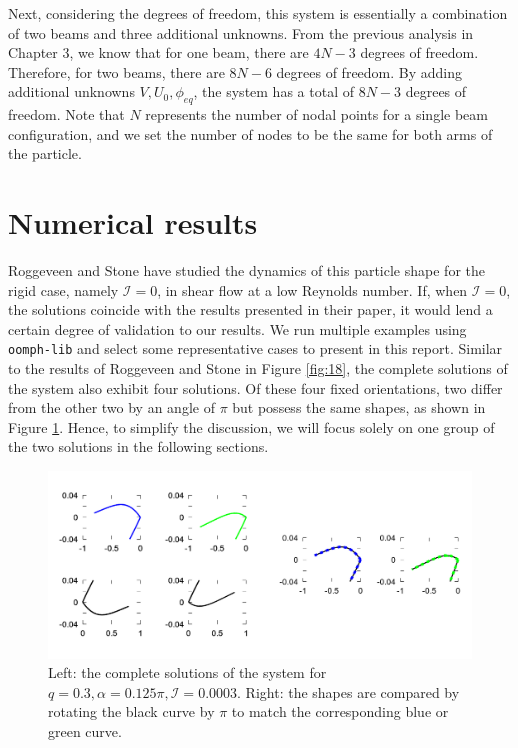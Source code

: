 \documentclass[12pt,MSc,twoside]{muthesis_2020}
\begin{document}
Next, considering the degrees of freedom, this system is essentially a combination of two beams and three additional unknowns. From the previous analysis in Chapter 3, we know that for one beam, there are $4N-3$ degrees of freedom. Therefore, for two beams, there are $8N-6$ degrees of freedom. By adding additional unknowns $V,U_0,\phi_{eq}$, the system has a total of $8N-3$ degrees of freedom. Note that $N$ represents the number of nodal points for a single beam configuration, and we set the number of nodes to be the same for both arms of the particle.


\section{Numerical results}
Roggeveen and Stone \cite{roggeveen2022motion} have studied the dynamics of this particle shape for the rigid case, namely $\mathcal{I}=0$, in shear flow at a low Reynolds number. If, when $\mathcal{I}=0$, the solutions coincide with the results presented in their paper, it would lend a certain degree of validation to our results.
We run multiple examples using \texttt{oomph-lib} and select some representative cases to present in this report. Similar to the results of Roggeveen and Stone in Figure \ref{fig:18}, the complete solutions of the system also exhibit four solutions. Of these four fixed orientations, two differ from the other two by an angle of $\pi$ but possess the same shapes, as shown in Figure \ref{fig:20}. Hence, to simplify the discussion, we will focus solely on one group of the two solutions in the following sections.
	\begin{figure}[!h]
	\begin{center}
		\includegraphics[width=1\textwidth]{plot/four_solutions2.png}
		\caption{Left: the complete solutions of the system for $q=0.3, \alpha=0.125\pi, \mathcal{I}=0.0003$. Right: the shapes are compared by rotating the black curve by $\pi$ to match the corresponding blue or green curve.}
    \label{fig:20}
	\end{center}
\end{figure}
\end{document}
